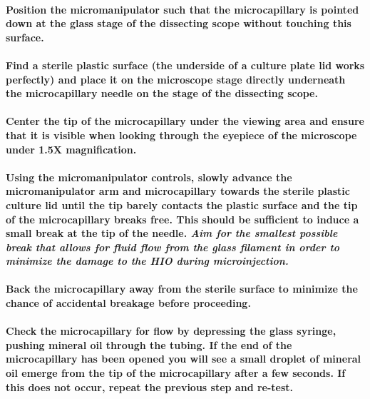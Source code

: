 \documentclass[11pt]{article}
\begin{document}
\paragraph{{\sffamily } Position the micromanipulator such that the microcapillary is pointed down at the glass stage of the dissecting scope without touching this surface.}
\label{sec:orgheadline33}
\paragraph{{\sffamily } Find a sterile plastic surface (the underside of a culture plate lid works perfectly) and place it on the microscope stage directly underneath the microcapillary needle on the stage of the dissecting scope.}
\label{sec:orgheadline34}
\paragraph{{\sffamily } Center the tip of the microcapillary under the viewing area and ensure that it is visible when looking through the eyepiece of the microscope under 1.5X magnification.}
\label{sec:orgheadline35}
\paragraph{{\sffamily } Using the micromanipulator controls, slowly advance the micromanipulator arm and microcapillary towards the sterile plastic culture lid until the tip barely contacts the plastic surface and the tip of the microcapillary breaks free.  This should be sufficient to induce a small break at the tip of the needle. \emph{Aim for the smallest possible break that allows for fluid flow from the glass filament in order to minimize the damage to the HIO during microinjection.}}
\label{sec:orgheadline36}

\paragraph{{\sffamily } Back the microcapillary away from the sterile surface to minimize the chance of accidental breakage before proceeding.}
\label{sec:orgheadline37}
\paragraph{{\sffamily } Check the microcapillary for flow by depressing the glass syringe, pushing mineral oil through the tubing. If the end of the microcapillary has been opened you will see a small droplet of mineral oil emerge from the tip of the microcapillary after a few seconds. If this does not occur, repeat the previous step and re-test.}
\label{sec:orgheadline38}
\end{document}
